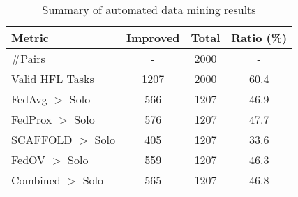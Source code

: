\begin{table}[htbp]
\centering
\small
\caption{Summary of automated data mining results}
\label{tab:fl_improvement_summary}
\begin{tabular}{lccc}
\toprule
\textbf{Metric} & \textbf{Improved} & \textbf{Total} & \textbf{Ratio (\%)} \\
\midrule
\#Pairs & - & 2000 & - \\
Valid HFL Tasks & 1207 & 2000 & 60.4 \\
FedAvg $>$ Solo & 566 & 1207 & 46.9 \\
FedProx $>$ Solo & 576 & 1207 & 47.7 \\
SCAFFOLD $>$ Solo & 405 & 1207 & 33.6 \\
FedOV $>$ Solo & 559 & 1207 & 46.3 \\
Combined $>$ Solo & 565 & 1207 & 46.8 \\
\bottomrule
\end{tabular}
\end{table}